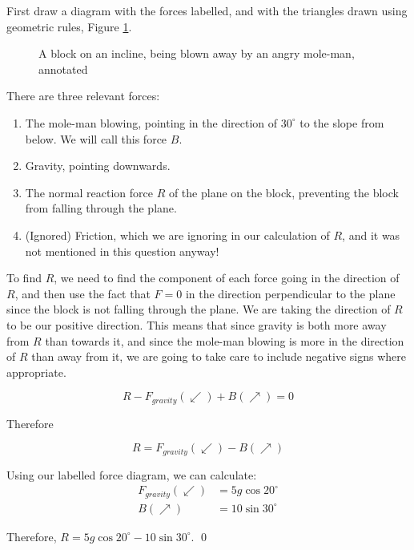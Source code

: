 \begin{solution}
    First draw a diagram with the forces labelled, and with the triangles drawn using geometric rules, Figure \ref{fig:block-on-plane-moleman-annotated}.

        \begin{figure}[H]
        \centering
        \caption{A block on an incline, being blown away by an angry mole-man, annotated}
        \label{fig:block-on-plane-moleman-annotated}
    \end{figure}
    There are three relevant forces:
    \begin{enumerate}
        \item The mole-man blowing, pointing in the direction of $30^\circ$ to the slope from below. We will call this force $B$.
        \item Gravity, pointing downwards.
        \item The normal reaction force $R$ of the plane on the block, preventing the block from falling through the plane.
        \item (Ignored) Friction, which we are ignoring in our calculation of $R$, and it was not mentioned in this question anyway!
    \end{enumerate}
    To find $R$, we need to find the component of each force going in the direction of $R$, and then use the fact that $F=0$ in the direction perpendicular to the plane since 
    the block is not falling through the plane. We are taking the direction of $R$ to be our positive direction. 
    This means that since gravity is both more away from $R$ than towards it, and since the mole-man blowing is more in the direction of $R$ than away from it, we are going to take care to include negative signs where appropriate.

    \[ R -F_{gravity}(\swarrow) + B(\nearrow) = 0\]

    Therefore 

    \[R = F_{gravity}(\swarrow) - B(\nearrow)\]

    Using our labelled force diagram, we can calculate:
    \begin{align*}
    F_{gravity}(\swarrow) &=  5g \cos 20^\circ \\
    B(\nearrow) &= 10 \sin 30^\circ 
    \end{align*}

    Therefore, $R = 5g \cos 20^\circ - 10 \sin 30^\circ $.
    \qed
\end{solution}


